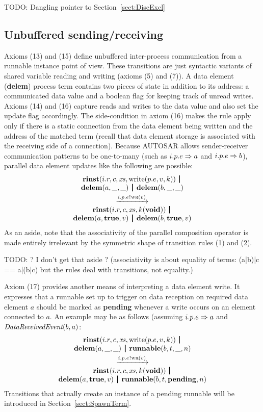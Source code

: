 \documentclass[twocolumn]{article}
\begin{document}
TODO: Dangling pointer to Section~\ref{sect:DiscExcl}

\subsection{Unbuffered sending/receiving}

Axioms (13) and (15) define unbuffered inter-process communication from a runnable instance point of view. These transitions are just syntactic variants of shared variable reading and writing (axioms (5) and (7)). A data element (\textbf{delem}) process term contains two pieces of state in addition to its address: a communicated data value and a boolean flag for keeping track of unread writes. Axioms (14) and (16) capture reads and writes to the data value and also set the update flag accordingly. The side-condition in axiom (16) makes the rule apply only if there is a static connection from the data element being written and the address of the matched term (recall that data element storage is associated with the receiving side of a connection). Because AUTOSAR allows sender-receiver communication patterns to be one-to-many (such as $i.p.e \Rightarrow a$ and $i.p.e \Rightarrow b$), parallel data element updates like the following are possible:
$$
\begin{array}{c}
  \Trinst {i.r} c \Xs {\TrteWrite {p.e} v k} \,\Opar  \\
  {\Tdelem a \_ \_} \Opar {\Tdelem b \_ \_} \vspace{0.6ex} \\
  \red{\say{i.p.e}{\Twr v}} \\
  \Trinst {i.r} c \Xs {\Tap k \Tvoid} \,\Opar \\
  {\Tdelem a \Ttrue v} \Opar {\Tdelem b \Ttrue v}
\end{array}
$$
As an aside, note that the associativity of the parallel composition operator is made entirely irrelevant by the symmetric shape of transition rules (1) and (2).

TODO: ? I don't get that aside ? (associativity is about equality of terms: (a|b)|c == a|(b|c) but the rules deal with transitions, not equality.)

Axiom (17) provides another means of interpreting a data element write. It expresses that a runnable set up to trigger on data reception on required data element $a$ should be marked as \textbf{pending} whenever a write occurs on an element connected to $a$. An example may be as follows (assuming $i.p.e \Rightarrow a$ and $\emph{DataReceivedEvent}(b,a)$:
$$
\begin{array}{c}
  \Trinst {i.r} c \Xs {\TrteWrite {p.e} v k} \,\Opar  \\
  {\Tdelem a \_ \_} \Opar {\Trunnable b t \_ n} \vspace{0.6ex} \\
  \red{\say{i.p.e}{\Twr v}} \\
  \Trinst {i.r} c \Xs {\Tap k \Tvoid} \,\Opar \\
  {\Tdelem a \Ttrue v} \Opar {\Trunnable b t \Tpending n}
\end{array}
$$
Transitions that actually create an instance of a pending runnable will be introduced in Section~\ref{sect:SpawnTerm}.
\end{document}
